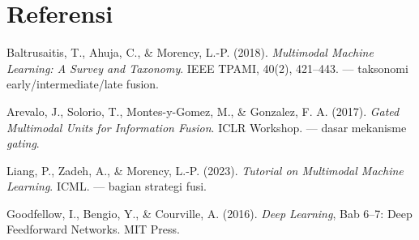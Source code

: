 \documentclass[12pt, a4paper]{article}
\begin{document}
\section*{Referensi}
{\small\color{ctpSubtext}
\begin{enumerate}[label={[\arabic*]}, leftmargin=2em]
  \item Baltrusaitis, T., Ahuja, C., \& Morency, L.-P. (2018). \emph{Multimodal Machine Learning: A Survey and Taxonomy}. IEEE TPAMI, 40(2), 421--443. --- taksonomi early/intermediate/late fusion.
  \item Arevalo, J., Solorio, T., Montes-y-Gomez, M., \& Gonzalez, F. A. (2017). \emph{Gated Multimodal Units for Information Fusion}. ICLR Workshop. --- dasar mekanisme \emph{gating}.
  \item Liang, P., Zadeh, A., \& Morency, L.-P. (2023). \emph{Tutorial on Multimodal Machine Learning}. ICML. --- bagian strategi fusi.
  \item Goodfellow, I., Bengio, Y., \& Courville, A. (2016). \emph{Deep Learning}, Bab 6--7: Deep Feedforward Networks. MIT Press.
\end{enumerate}}
\end{document}
